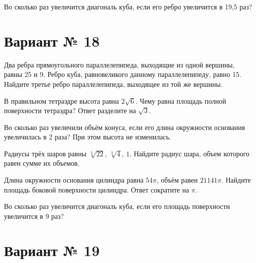 \documentclass[4apaper]{article}
\begin{document}
\begin{taskBN}{6}
Во сколько раз увеличится диагональ куба, если его ребро увеличится в 19,5 раз?
\end{taskBN}
\newpage\section*{Вариант № 18}

\begin{taskBN}{1}
Два ребра прямоугольного параллелепипеда, выходящие из одной вершины, равны 25 и 9. Ребро куба, равновеликого данному параллелепипеду, равно 15. Найдите третье ребро параллелепипеда, выходящее из той же вершины.
\end{taskBN}

\begin{taskBN}{2}
В правильном тетраэдре высота равна $2\sqrt{6}$. Чему равна площадь полной поверхности тетраэдра? Ответ разделите на $\sqrt{3}$.
\end{taskBN}

\begin{taskBN}{3}
Во сколько раз увеличили объём конуса, если его длина окружности основания увеличилась в 2 раза? При этом высота не изменилась.
\end{taskBN}

\begin{taskBN}{4}
Радиусы трёх шаров равны $\sqrt[3]{22}$, $\sqrt[3]{4}$, $1$. Найдите радиус шара, объем которого равен сумме их объемов.
\end{taskBN}

\begin{taskBN}{5}
Длина окружности основания цилиндра равна $54\pi$, объём равен $21141\pi$. Найдите площадь боковой поверхности цилиндра. Ответ сократите на $\pi$.
\end{taskBN}

\begin{taskBN}{6}
Во сколько раз увеличится диагональ куба, если его площадь поверхности увеличится в 9 раз?
\end{taskBN}
\newpage\section*{Вариант № 19}
\end{document}
